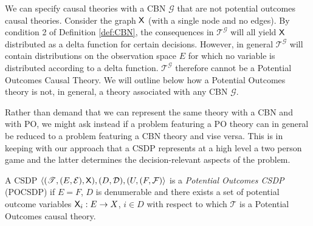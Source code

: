 We can specify causal theories with a CBN $\mathcal{G}$ that are not potential outcomes causal theories. Consider the graph $\mathsf{X}$ (with a single node and no edges). By condition 2 of Definition \ref{def:CBN}, the consequences in $\mathscr{T}^{\mathcal{G}}$ will all yield $\mathsf{X}$ distributed as a delta function for certain decisions. However, in general $\mathscr{T}^{\mathcal{G}}$ will contain distributions on the observation space $E$ for which no variable is distributed according to a delta function. $\mathscr{T}^{\mathcal{G}}$ therefore cannot be a Potential Outcomes Causal Theory. We will outline below how a Potential Outcomes theory is not, in general, a theory associated with any CBN $\mathcal{G}$.

Rather than demand that we can represent the same theory with a CBN and with PO, we might ask instead if a problem featuring a PO theory can in general be reduced to a problem featuring a CBN theory and vise versa. This is in keeping with our approach that a CSDP represents at a high level a two person game and the latter determines the decision-relevant aspects of the problem.


\begin{definition}
A CSDP $\langle (\mathscr{T},(E,\mathcal{E}),\mathsf{X}),(D,\mathcal{D}), (U,(F,\mathcal{F})\rangle$ is a \emph{Potential Outcomes CSDP} (POCSDP) if $E=F$, $D$ is denumerable and there exists a set of potential outcome variables $\mathsf{X}_i:E\to X$, $i\in D$ with respect to which $\mathscr{T}$ is a Potential Outcomes causal theory.
\end{definition}

